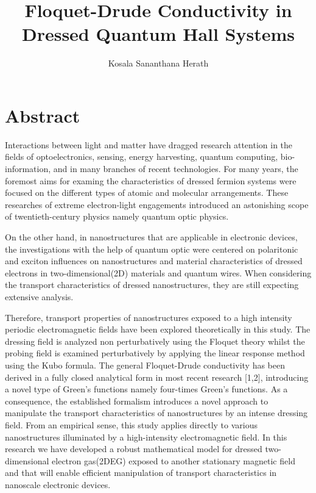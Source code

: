 \documentclass[a4paper]{article}
\title{Floquet-Drude Conductivity in Dressed Quantum Hall Systems}
\author{Kosala Sananthana Herath}
\numberwithin{equation}{subsection}
\numberwithin{equation}{section}
\begin{document}
\maketitle

\section*{Abstract}

Interactions between light and matter have dragged research attention in the fields of optoelectronics, sensing, energy harvesting, quantum computing, bio-information, and in many branches of recent technologies. For many years, the foremost aims for examing the characteristics of dressed fermion systems were focused on the different types of atomic and molecular arrangements. These researches of extreme electron-light engagements introduced an astonishing scope of twentieth-century physics namely quantum optic physics.

On the other hand, in nanostructures that are applicable in electronic devices, the investigations with the help of quantum optic were centered on polaritonic and exciton influences on nanostructures and material characteristics of dressed electrons in two-dimensional(2D) materials and quantum wires. When considering the transport characteristics of dressed nanostructures, they are still expecting extensive analysis.

Therefore, transport properties of nanostructures exposed to a high intensity periodic electromagnetic fields have been explored theoretically in this study. The dressing field is analyzed non perturbatively using the Floquet theory whilst the probing field is examined perturbatively by applying the linear response method using the Kubo formula. The general Floquet-Drude conductivity has been derived in a fully closed analytical form in most recent research [1,2], introducing a novel type of Green’s functions namely four-times Green’s functions.
As a consequence, the established formalism introduces a novel approach to manipulate the transport characteristics of nanostructures by an intense dressing field. From an empirical sense, this study applies directly to various nanostructures illuminated by a high-intensity electromagnetic field.
In this research we have developed a robust mathematical model for dressed two-dimensional electron gas(2DEG) exposed to another stationary magnetic field and that will enable efficient manipulation of transport characteristics in nanoscale electronic devices.
\end{document}
